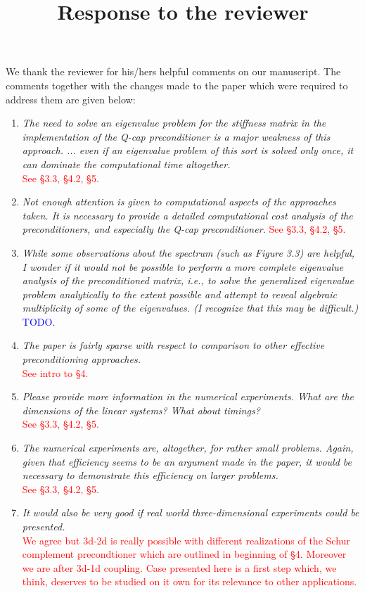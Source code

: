\documentclass[10pt, a4paper]{article}
\title{\large{Response to the reviewer}}
\date{}
\begin{document}
\maketitle

We thank the reviewer for his/hers helpful comments on our manuscript. The
comments together with the changes made to the paper which were required to
address them are given below:
\begin{enumerate}
  \item{\textit{
The need to solve an eigenvalue problem for the stiffness matrix in the implementation 
of the Q-cap preconditioner is a major weakness of this approach. ... even if an eigenvalue 
problem of this sort is solved only once, it can dominate the computational time altogether.
}\\
\textcolor{red}{See \S 3.3, \S 4.2, \S 5.}
}
  \item{\textit{
Not enough attention is given to computational aspects of the approaches taken. It is 
necessary to provide a detailed computational cost analysis of the preconditioners, 
and especially the Q-cap preconditioner. 
}
    \textcolor{red}{See \S 3.3, \S 4.2, \S 5.}
}
  \item{\textit{
While some observations about the spectrum (such as Figure 3.3) are helpful, I wonder if 
it would not be possible to perform a more complete eigenvalue analysis of the preconditioned 
matrix, i.e., to solve the generalized eigenvalue problem analytically to the extent possible 
and attempt to reveal algebraic multiplicity of some of the eigenvalues. (I recognize that this 
may be difficult.)}\\
\textcolor{blue}{TODO.}
}
  \item{\textit{
The paper is fairly sparse with respect to comparison to other effective preconditioning approaches.
  }\\
  \textcolor{red}{See intro to \S 4.}
}
  \item{\textit{
Please provide more information in the numerical experiments. What are the dimensions 
    of the linear systems? What about timings?
    }\\
    \textcolor{red}{See \S 3.3, \S 4.2, \S 5.}
}
  \item{\textit{
The numerical experiments are, altogether, for rather small problems. Again, given 
that efficiency seems to be an argument made in the paper, it would be necessary 
to demonstrate this efficiency on larger problems.}\\
    \textcolor{red}{See \S 3.3, \S 4.2, \S 5.}

}
  \item{\textit{
It would also be very good if real world three-dimensional experiments could be presented.
    }\\
    \textcolor{red}{We agree but 3d-2d is really possible with different realizations of the
    Schur complement precondtioner which are outlined in beginning of \S 4.
    Moreover we are after 3d-1d coupling. Case presented here is a first step
    which, we think, deserves to be studied on it own for its relevance to other
    applications.}
}

\end{enumerate}
\end{document}
